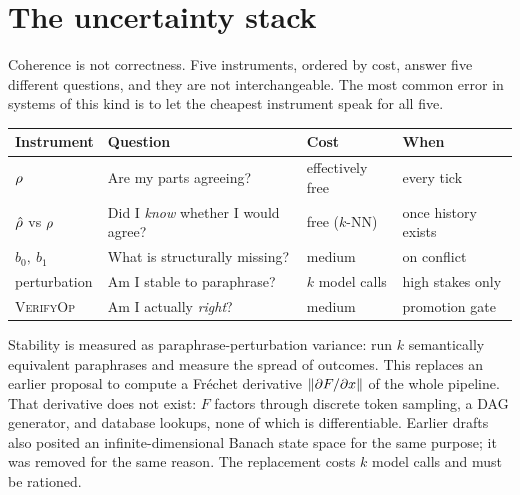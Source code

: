 \section{The uncertainty stack}\label{sec:uncert}

\begin{intu}\Intu
Coherence is not correctness. Five instruments, ordered by cost, answer
five different questions, and they are not interchangeable. The most
common error in systems of this kind is to let the cheapest instrument
speak for all five.
\end{intu}

\begin{center}
\renewcommand{\arraystretch}{1.3}
\begin{tabular}{@{}p{2.7cm}p{5.2cm}p{2.5cm}p{2.9cm}@{}}
\toprule
\textbf{Instrument} & \textbf{Question} & \textbf{Cost} & \textbf{When}\\
\midrule
$\rho$ & Are my parts agreeing? & effectively free & every tick\\
$\hat{\rho}$ vs $\rho$ & Did I \emph{know} whether I would agree? & free ($k$-NN) & once history exists\\
$b_0,\ b_1$ & What is structurally missing? & medium & on conflict\\
perturbation & Am I stable to paraphrase? & $k$ model calls & high stakes only\\
\textsc{VerifyOp} & Am I actually \emph{right}? & medium & promotion gate\\
\bottomrule
\end{tabular}
\end{center}

\begin{remark}\label{rem:perturbation}
Stability is measured as paraphrase-perturbation variance: run $k$
semantically equivalent paraphrases and measure the spread of outcomes.
This replaces an earlier proposal to compute a Fr\'echet derivative
$\left\lVert \partial F/\partial x \right\rVert$ of the whole pipeline. That derivative
does not exist: $F$ factors through discrete token sampling, a DAG
generator, and database lookups, none of which is differentiable.
Earlier drafts also posited an infinite-dimensional Banach state space
for the same purpose; it was removed for the same reason. The
replacement costs $k$ model calls and must be rationed.
\end{remark}

